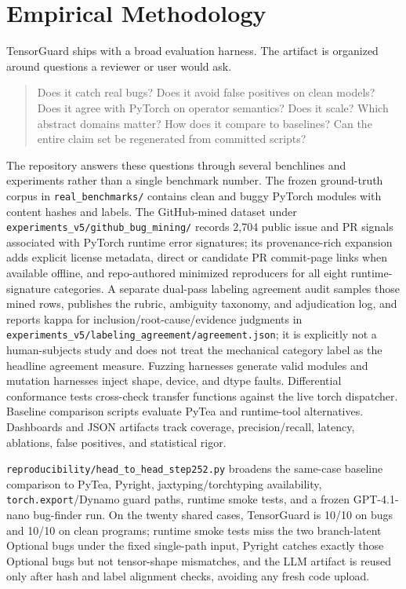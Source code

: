 \documentclass[11pt]{article}
\newcommand{\tg}{TensorGuard}
\begin{document}
\section{Empirical Methodology}

\tg{} ships with a broad evaluation harness.  The artifact is organized around
questions a reviewer or user would ask.

\begin{quote}
Does it catch real bugs?  Does it avoid false positives on clean models?  Does
it agree with PyTorch on operator semantics?  Does it scale?  Which abstract
domains matter?  How does it compare to baselines?  Can the entire claim set be
regenerated from committed scripts?
\end{quote}

The repository answers these questions through several benchlines and
experiments rather than a single benchmark number.  The frozen ground-truth
corpus in \texttt{real\_benchmarks/} contains clean and buggy PyTorch modules
with content hashes and labels.  The GitHub-mined dataset under
\texttt{experiments\_v5/github\_bug\_mining/} records 2,704 public issue and PR
signals associated with PyTorch runtime error signatures; its provenance-rich
expansion adds explicit license metadata, direct or candidate PR commit-page
links when available offline, and repo-authored minimized reproducers for all
eight runtime-signature categories.  A separate dual-pass labeling agreement
audit samples those mined rows, publishes the rubric, ambiguity taxonomy, and
adjudication log, and reports kappa for inclusion/root-cause/evidence judgments
in \texttt{experiments\_v5/labeling\_agreement/agreement.json}; it is explicitly
not a human-subjects study and does not treat the mechanical category label as
the headline agreement measure.  Fuzzing harnesses generate valid modules
and mutation harnesses inject shape, device, and dtype faults.  Differential
conformance tests cross-check transfer functions against the live torch
dispatcher.  Baseline comparison scripts evaluate PyTea and runtime-tool
alternatives.  Dashboards and JSON artifacts track coverage, precision/recall,
latency, ablations, false positives, and statistical rigor.

\texttt{reproducibility/head\_to\_head\_step252.py} broadens the same-case
baseline comparison to PyTea, Pyright, jaxtyping/torchtyping availability,
\texttt{torch.export}/Dynamo guard paths, runtime smoke tests, and a frozen
GPT-4.1-nano bug-finder run.  On the twenty shared cases, \tg{} is 10/10 on
bugs and 10/10 on clean programs; runtime smoke tests miss the two branch-latent
Optional bugs under the fixed single-path input, Pyright catches exactly those
Optional bugs but not tensor-shape mismatches, and the LLM artifact is reused
only after hash and label alignment checks, avoiding any fresh code upload.
\end{document}
